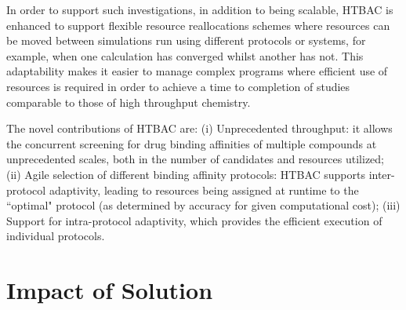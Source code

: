 \documentclass[conference]{IEEEtran}
\begin{document}


In order to support such
investigations, in addition to being scalable, HTBAC is enhanced to
support flexible resource reallocations schemes where resources can be moved
between simulations run using different protocols or systems, for example,
when one calculation has converged whilst another has not. This adaptability
makes it easier to manage complex programs where efficient use of resources
is required in order to achieve a time to completion of studies comparable to
those of high throughput chemistry.

The novel contributions of HTBAC are: (i) Unprecedented throughput: it allows
the concurrent screening for drug binding affinities of multiple compounds at
unprecedented scales, both in the number of candidates and resources utilized;
(ii) Agile selection of different binding affinity protocols: HTBAC supports
inter-protocol adaptivity, leading to resources being assigned at runtime to
the ``optimal" protocol (as determined by accuracy for given computational
cost); (iii) Support for intra-protocol adaptivity, which provides the
efficient execution of individual protocols.






\section{Impact of Solution}\label{sec:impact}
\end{document}
